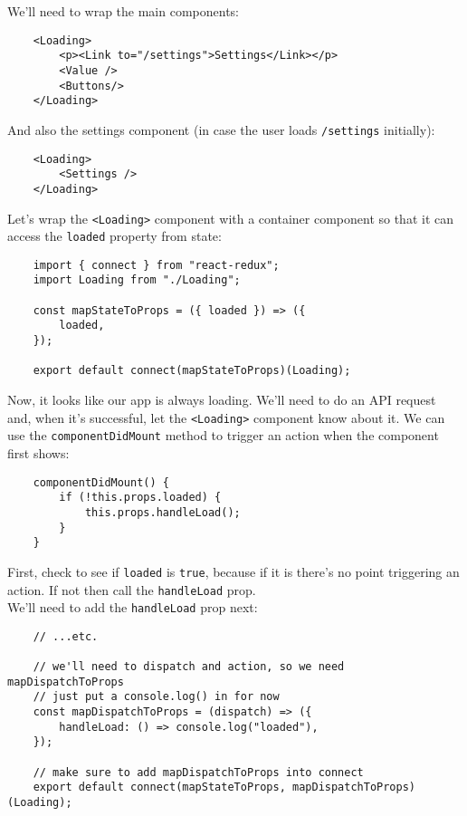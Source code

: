 We'll need to wrap the main components:

\begin{verbatim}
    <Loading>
        <p><Link to="/settings">Settings</Link></p>
        <Value />
        <Buttons/>
    </Loading>
\end{verbatim}

And also the settings component (in case the user loads \texttt{/settings} initially):

\begin{verbatim}
    <Loading>
        <Settings />
    </Loading>
\end{verbatim}

Let's wrap the \texttt{<Loading>} component with a container component so that it can access the \texttt{loaded} property from state:

\begin{verbatim}
    import { connect } from "react-redux";
    import Loading from "./Loading";

    const mapStateToProps = ({ loaded }) => ({
        loaded,
    });

    export default connect(mapStateToProps)(Loading);
\end{verbatim}

Now, it looks like our app is always loading. We'll need to do an API request and, when it's successful, let the \texttt{<Loading>} component know about it. We can use the \texttt{componentDidMount} method to trigger an action when the component first shows:

\begin{verbatim}
    componentDidMount() {
        if (!this.props.loaded) {
            this.props.handleLoad();
        }
    }
\end{verbatim}

First, check to see if \texttt{loaded} is \texttt{true}, because if it is there's no point triggering an action. If not then call the \texttt{handleLoad} prop.
\\

We'll need to add the \texttt{handleLoad} prop next:

\begin{verbatim}
    // ...etc.

    // we'll need to dispatch and action, so we need mapDispatchToProps
    // just put a console.log() in for now
    const mapDispatchToProps = (dispatch) => ({
        handleLoad: () => console.log("loaded"),
    });

    // make sure to add mapDispatchToProps into connect
    export default connect(mapStateToProps, mapDispatchToProps)(Loading);
\end{verbatim}

